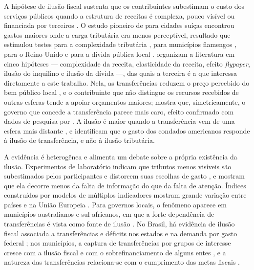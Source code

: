 A hipótese de ilusão fiscal sustenta que os contribuintes subestimam o custo dos serviços públicos quando a estrutura de receitas é complexa, pouco visível ou financiada por terceiros \cite{wagner1976}. O estudo pioneiro de  para cidades suíças encontrou gastos maiores onde a carga tributária era menos perceptível, resultado que estimulou testes para a complexidade tributária \cite{misiolek1988,heyndels1995}, para municípios flamengos \cite{heyndels1994}, para o Reino Unido \cite{gemmell1999} e para a dívida pública local \cite{banzhaf2013}.  organizam a literatura em cinco hipóteses --- complexidade da receita, elasticidade da receita, efeito \textit{flypaper}, ilusão do inquilino e ilusão da dívida ---, das quais a terceira é a que interessa diretamente a este trabalho. Nela, as transferências reduzem o preço percebido do bem público local \cite{logan1986,turnbull1992,turnbull1998}, e o contribuinte que não distingue os recursos recebidos de outras esferas tende a apoiar orçamentos maiores;  mostra que, simetricamente, o governo que concede a transferência parece mais caro, efeito confirmado com dados de pesquisa por . A ilusão é maior quando a transferência vem de uma esfera mais distante \cite{grossman1990}, e  identificam que o gasto dos condados americanos responde à ilusão de transferência, e não à ilusão tributária.

A evidência é heterogênea e alimenta um debate sobre a própria existência da ilusão. Experimentos de laboratório indicam que tributos menos visíveis são subestimados pelos participantes e distorcem suas escolhas de gasto \cite{sausgruber2005}, e  mostram que ela decorre menos da falta de informação do que da falta de atenção. Índices construídos por modelos de múltiplos indicadores mostram grande variação entre países \cite{dellanno2012} e na União Europeia \cite{dellanno2014}. Para governos locais, o fenômeno aparece em municípios australianos \cite{worthington1999} e sul-africanos, em que a forte dependência de transferências é vista como fonte de ilusão \cite{amusa2008}. No Brasil, há evidência de ilusão fiscal associada a transferências e déficits nos estados \cite{prado2020} e na demanda por gasto federal \cite{silva2015}; nos municípios, a captura de transferências por grupos de interesse cresce com a ilusão fiscal e com o sobrefinanciamento de alguns entes \cite{mendes2005}, e a natureza das transferências relaciona-se com o cumprimento das metas fiscais \cite{araujo2020}.

